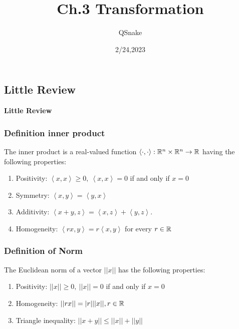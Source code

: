 
\title{Ch.3 Transformation}
\author{QSnake}
\date{2/24,2023}


\begin{frame}
	\titlepage
\end{frame}
\begin{frame}
	\tableofcontents
\end{frame}




\begin{frame}
	\section{Little Review}
	\begin{center}
	\textbf{Little Review}
	\end{center}
\end{frame}

\begin{frame}
	\frametitle{Definition inner product}

	The inner product is a real-valued function $\left< \cdot , \cdot \right>:\mathbb{R}^n \times \mathbb{R}^n \rightarrow \mathbb{R}$ having the following properties:

	\begin{enumerate}
		\item Positivity: $\left<x,x\right> \geq 0,~\left<x,x\right> = 0$ if and only if $x = 0$
		\item Symmetry: $\left<x,y\right> = \left<y,x\right>$
		\item Additivity: $\left<x+y,z\right> = \left<x,z\right> + \left<y,z\right>$.
		\item Homogeneity: $\left< rx,y\right> = r\left<x,y\right>$ for every $r \in \mathbb{R}$
	\end{enumerate}
\end{frame}

\begin{frame}
	\frametitle{Definition of Norm}
	The Euclidean norm of a vector $||x||$ has the following properties:

	\begin{enumerate}
	\item Positivity: $||x|| \geq 0,~||x||=0$ if and only if $x = 0$
	\item Homogeneity: $||rx|| = |r|||x||,r\in \mathbb{R}$
	\item Triangle inequality: $||x + y|| \leq ||x|| + ||y||$
	\end{enumerate}
\end{frame}

